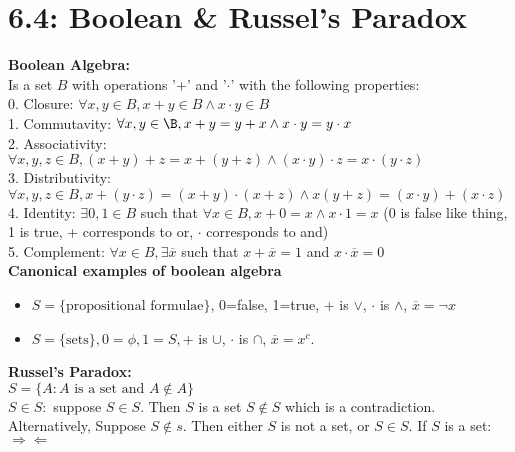 \documentclass[12pt,letterpaper, onecolumn]{exam}
\begin{document}
	\section{6.4: Boolean \& Russel's Paradox}
	\textbf{Boolean Algebra:}\\
	Is a set $B$ with operations '+' and '$\cdot$' with the following properties:\\
	0. Closure: $\forall x,y \in B, x+y\in B \land x\cdot y \in B$\\
	1. Commutavity: $\forall x,y \in \B, x+y=y+x \land x\cdot y=y\cdot x$\\
	2. Associativity: $\forall x,y,z \in B, (x+y)+z=x+(y+z) \land (x\cdot y)\cdot z=x\cdot(y\cdot z)$\\
	3. Distributivity: $\forall x,y,z \in B, x+(y\cdot z)=(x+y)\cdot(x+z) \land x(y+z)=(x\cdot y)+(x\cdot z)$\\
	4. Identity: $\exists 0,1 \in B$ such that $\forall x \in B, x+0=x \land x\cdot1=x$ (0 is false like thing, 1 is true, + corresponds to or, $\cdot$ corresponds to and)\\
	5. Complement: $\forall x \in B, \exists \overline{x}$ such that $x+\overline{x}=1$ and $x\cdot\overline{x}=0$\\
	\textbf{Canonical examples of boolean algebra}
	\begin{itemize}
		\item $S=\{\text{propositional formulae}\}$, 0=false, 1=true, + is $\lor$, $\cdot$ is $\land$, $\overline{x}=\neg x$
		\item $S=\{\text{sets}\}, 0=\phi, 1=S, +$ is $\cup$, $\cdot$ is $\cap$, $\overline{x}=x^c$.
	\end{itemize}
		\textbf{Russel's Paradox:}\\
		$S=\{A:A \text{ is a set and $A\notin A$}\}$\\
		$S\in S:$ suppose $S\in S$. Then $S$ is a set $S\notin S$ which is a contradiction. Alternatively, Suppose $S\notin s$. Then either $S$ is not a set, or $S\in S$. If $S$ is a set:$\Rightarrow\!\Leftarrow$
\end{document}
